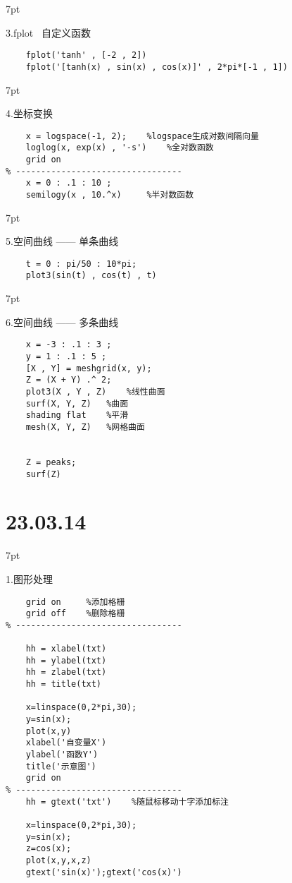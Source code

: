 \documentclass{article} %
\newenvironment{eg}{%
\def\FrameCommand{%
\hspace{1pt}%
{\color{Gray}\vrule width 2pt}%
{\color{egshade}\vrule width 4pt}%
\colorbox{egshade}%
}%
\MakeFramed{\advance\hsize-\width\FrameRestore}%
\noindent\hspace{-4.55pt}%
\begin{adjustwidth}{}{7pt}%
\vspace{2pt}\vspace{2pt}%
\normalfont %
}
{%
\vspace{2pt}\end{adjustwidth}\endMakeFramed%
}
\begin{document}
\begin{eg}
    3.fplot \ 自定义函数
\end{eg}
\begin{lstlisting}
    fplot('tanh' , [-2 , 2])
    fplot('[tanh(x) , sin(x) , cos(x)]' , 2*pi*[-1 , 1])
\end{lstlisting}

\begin{eg}
    4.坐标变换
\end{eg}
\begin{lstlisting}
    x = logspace(-1, 2);    %logspace生成对数间隔向量
    loglog(x, exp(x) , '-s')    %全对数函数
    grid on
% ---------------------------------
    x = 0 : .1 : 10 ;
    semilogy(x , 10.^x)     %半对数函数
\end{lstlisting}

\begin{eg}
    5.空间曲线 —— 单条曲线
\end{eg}
\begin{lstlisting}
    t = 0 : pi/50 : 10*pi;
    plot3(sin(t) , cos(t) , t)
\end{lstlisting}

\begin{eg}
    6.空间曲线 —— 多条曲线
\end{eg}
\begin{lstlisting}
    x = -3 : .1 : 3 ;
    y = 1 : .1 : 5 ;
    [X , Y] = meshgrid(x, y);
    Z = (X + Y) .^ 2;
    plot3(X , Y , Z)    %线性曲面
    surf(X, Y, Z)   %曲面
    shading flat    %平滑
    mesh(X, Y, Z)   %网格曲面
    

    Z = peaks;
    surf(Z)
\end{lstlisting}




\newpage
\noindent \Large \section*{23.03.14} \par \normalsize
\begin{eg}
    1.图形处理
\end{eg}
\begin{lstlisting}
    grid on     %添加格栅
    grid off    %删除格栅
% ---------------------------------

    hh = xlabel(txt)
    hh = ylabel(txt)
    hh = zlabel(txt)
    hh = title(txt)

    x=linspace(0,2*pi,30); 
    y=sin(x); 
    plot(x,y) 
    xlabel('自变量X') 
    ylabel('函数Y') 
    title('示意图') 
    grid on
% ---------------------------------
    hh = gtext('txt')    %随鼠标移动十字添加标注

    x=linspace(0,2*pi,30); 
    y=sin(x); 
    z=cos(x); 
    plot(x,y,x,z) 
    gtext('sin(x)');gtext('cos(x)') 
\end{lstlisting}
\end{document}

